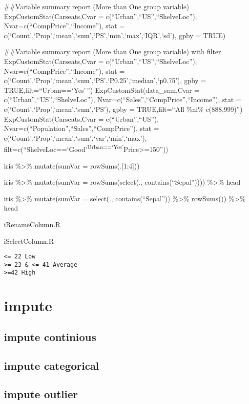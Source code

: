 \documentclass[]{article}
\begin{document}
\#\#Variable summary report (More than One group variable)
ExpCustomStat(Carseats,Cvar = c(``Urban'',``US'',``ShelveLoc''),
Nvar=c(``CompPrice'',``Income''), stat =
c(`Count',`Prop',`mean',`sum',`PS',`min',`max',`IQR',`sd'), gpby = TRUE)

\#\#Variable summary report (More than One group variable) with filter
ExpCustomStat(Carseats,Cvar = c(``Urban'',``US'',``ShelveLoc''),
Nvar=c(``CompPrice'',``Income''), stat =
c(`Count',`Prop',`mean',`sum',`PS',`P0.25',`median',`p0.75'), gpby =
TRUE,filt=``Urban==`Yes'\,'') ExpCustomStat(data\_sam,Cvar =
c(``Urban'',``US'',``ShelveLoc''),
Nvar=c(``Sales'',``CompPrice'',``Income''), stat =
c(`Count',`Prop',`mean',`sum',`PS'), gpby = TRUE,filt=``All \%ni\%
c(888,999)'') ExpCustomStat(Carseats,Cvar = c(``Urban'',``US''),
Nvar=c(``Population'',``Sales'',``CompPrice''), stat =
c(`Count',`Prop',`mean',`sum',`var',`min',`max'),
filt=c(``ShelveLoc==`Good'\textsuperscript{Urban==`Yes'}Price\textgreater=150''))

iris \%\textgreater\% mutate(sumVar = rowSums(.{[}1:4{]}))

iris \%\textgreater\% mutate(sumVar = rowSums(select(.,
contains(``Sepal'')))) \%\textgreater\% head

iris \%\textgreater\% mutate(sumVar = select(., contains(``Sepal''))
\%\textgreater\% rowSums()) \%\textgreater\% head

iRenameColumn.R

iSelectColumn.R

\begin{verbatim}
<= 22 Low
>= 23 & <= 41 Average 
>=42 High
\end{verbatim}

\hypertarget{impute}{%
\section{impute}\label{impute}}

\hypertarget{impute-continious}{%
\subsection{impute continious}\label{impute-continious}}

\hypertarget{impute-categorical}{%
\subsection{impute categorical}\label{impute-categorical}}

\hypertarget{impute-outlier}{%
\subsection{impute outlier}\label{impute-outlier}}
\end{document}
